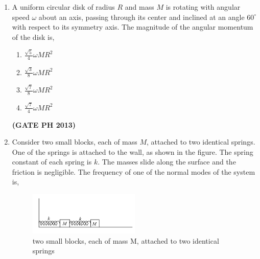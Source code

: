 \documentclass[14pt, a4paper]{extarticle}
\begin{document}
\begin{enumerate}[label=\textbf{Q. \arabic*}]
\item A uniform circular disk of radius $R$ and mass $M$ is rotating with angular speed $\omega$ about an axis, passing through its center and inclined at an angle $60^\circ$ with respect to its symmetry axis. The magnitude of the angular momentum of the disk is,
\begin{multicols}{4}
    \begin{enumerate}
        \item $\frac{\sqrt{5}}{4}\omega MR^2$
        \item $\frac{\sqrt{3}}{8}\omega MR^2$
        \item $\frac{\sqrt{7}}{8}\omega MR^2$
        \item $\frac{\sqrt{7}}{4}\omega MR^2$
    \end{enumerate}
\end{multicols}
\hfill \textbf{(GATE PH 2013)}

\item Consider two small blocks, each of mass $M$, attached to two identical springs. One of the springs is attached to the wall, as shown in the figure. The spring constant of each spring is $k$. The masses slide along the surface and the friction is negligible. The frequency of one of the normal modes of the system is,
\begin{figure}[H]
\centering
\includegraphics[width=0.5\textwidth]{figs/q.33fig2013.png}
\caption{two small blocks, each of mass M, attached to two identical
springs }
\label{fig:q33}
\end{figure}
\begin{enumerate}
\end{enumerate}


\end{enumerate}
\end{document}

